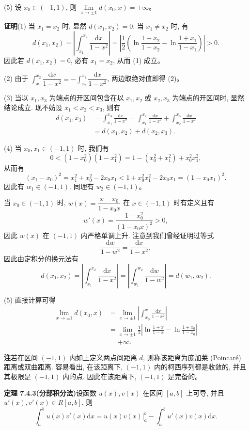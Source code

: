 \documentclass[UTF8, 12pt, fontset=fandol, oneside]{ctexart}
\begin{document}
(5) 设 $x_0\in(-1,1)$, 则 $\lim\limits_{x\to\pm1}d(x_0,x)=+\infty$。

\noindent\textbf{证明}\quad (1) 当 $x_1=x_2$ 时, 显然 $d(x_1,x_2)=0$. 当 $x_1\neq x_2$ 时, 有
\[
  d(x_1,x_2)
  =\left|\int_{x_1}^{x_2}\frac{\mathrm dx}{1-x^2}\right|
  =\left|\frac{1}{2}\left(\ln\frac{1+x_2}{1-x_2}-\ln\frac{1+x_1}{1-x_1}\right)\right|>0.
\]
因此若 $d(x_1,x_2)=0$, 必有 $x_1=x_2$, 从而 (1) 成立。

(2) 由于 $\int_{x_1}^{x_2}\dfrac{\mathrm dx}{1-x^2}=-\int_{x_2}^{x_1}\dfrac{\mathrm dx}{1-x^2}$, 两边取绝对值即得 (2)。

(3) 当以 $x_1,x_3$ 为端点的开区间包含在以 $x_1,x_2$ 或 $x_2,x_3$ 为端点的开区间时, 显然结论成立. 现不妨设 $x_1<x_2<x_3$, 则有
\[
\begin{aligned}
  d(x_1,x_3)
  &=\int_{x_1}^{x_3}\frac{\mathrm dx}{1-x^2}
  =\int_{x_1}^{x_2}\frac{\mathrm dx}{1-x^2}
  +\int_{x_2}^{x_3}\frac{\mathrm dx}{1-x^2}\\
  &=d(x_1,x_2)+d(x_2,x_3).
\end{aligned}
\]

(4) 当 $x_0,x_1\in(-1,1)$ 时, 我们有
\[
  0<(1-x_0^2)(1-x_1^2)=1-(x_0^2+x_1^2)+x_0^2x_1^2,
\]
从而有
\[
  (x_1-x_0)^2=x_1^2+x_0^2-2x_0x_1<1+x_0^2x_1^2-2x_0x_1=(1-x_0x_1)^2.
\]
因此有 $w_1\in(-1,1)$. 同理有 $w_2\in(-1,1)$。

当 $x_0\in(-1,1)$ 时, $w(x)=\dfrac{x-x_0}{1-x_0x}$ 在 $x\in(-1,1)$ 时有定义且有
\[
  w'(x)=\frac{1-x_0^2}{(1-x_0x)^2}>0,
\]
因此 $w(x)$ 在 $(-1,1)$ 内严格单调上升. 注意到我们曾经证明过等式
\[
  \frac{\mathrm dw}{1-w^2}=\frac{\mathrm dx}{1-x^2},
\]
因此由定积分的换元法有
\[
  d(x_1,x_2)=\left|\int_{x_1}^{x_2}\frac{\mathrm dx}{1-x^2}\right|
  =\left|\int_{w_1}^{w_2}\frac{\mathrm dw}{1-w^2}\right|
  =d(w_1,w_2).
\]

(5) 直接计算可得
\[
\begin{aligned}
  \lim_{x\to\pm1}d(x_0,x)
  &=\lim_{x\to\pm1}\left|\int_{x_0}^x\frac{\mathrm dx}{1-x^2}\right|\\
  &=\lim_{x\to\pm1}\frac{1}{2}
  \left|\ln\frac{1+x}{1-x}-\ln\frac{1+x_0}{1-x_0}\right|\\
  &=+\infty.
\end{aligned}
\]

\noindent\textbf{注}\quad 若在区间 $(-1,1)$ 内如上定义两点间距离 $d$, 则称该距离为庞加莱 (Poincaré) 距离或双曲距离. 容易看出, 在该距离下, $(-1,1)$ 内的柯西序列都是收敛的, 并且其极限是 $(-1,1)$ 内的点. 因此在该距离下, $(-1,1)$ 是完备的。

\noindent\textbf{定理 7.4.3(分部积分法)}\quad 设函数 $u(x),v(x)$ 在区间 $[a,b]$ 上可导, 并且 $u'(x),v'(x)\in R[a,b]$, 则
\[
  \int_a^b u(x)v'(x)\mathrm dx
  =\left.u(x)v(x)\right|_a^b-\int_a^b u'(x)v(x)\mathrm dx.
\]
\end{document}
